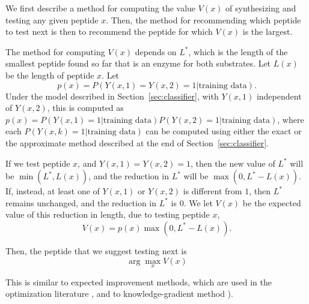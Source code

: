 \documentclass[12pt]{article}
\newcommand{\data}{\text{training data}}
\begin{document}
We first describe a method for computing the value $V(x)$ of synthesizing and testing any given peptide $x$.  Then, the method for recommending which peptide to test next is then to recommend the peptide for which $V(x)$ is the largest.

The method for computing $V(x)$ depends on $L^*$, which is the length of the smallest peptide found so far that is an enzyme for both substrates.  
Let $L(x)$ be the length of peptide $x$.
Let 
\begin{equation*}
  p(x) = P\left(Y(x,1)=Y(x,2)=1 | \data\right).
\end{equation*}
Under the model described in Section~\ref{sec:classifier}, with $Y(x,1)$ independent of $Y(x,2)$, this is computed as $p(x) = P\left(Y(x,1)=1 | \data\right) P\left(Y(x,2)=1 | \data\right)$, where each $P(Y(x,k)=1 | \data)$ can be computed using either the exact or the approximate method described at the end of Section~\ref{sec:classifier}.

If we test peptide $x$, and $Y(x,1)=Y(x,2)=1$, then the new value of $L^*$ will be $\min(L^*,L(x))$, and the reduction in $L^*$ will be $\max(0,L^*-L(x))$.
If, instead, at least one of $Y(x,1)$ or $Y(x,2)$ is different from $1$, then $L^*$ remains unchanged, and the reduction in $L^*$ is $0$.  
We let $V(x)$ be the expected value of this reduction in length, due to testing peptide $x$,
\begin{equation*}
  V(x) = p(x)\max(0,L^*-L(x)).
\end{equation*}

Then, the peptide that we suggest testing next is 
\begin{equation*}
  \arg\max_x V(x)
\end{equation*}

This is similar to expected improvement methods, which are used in the optimization literature \cite{JoScWe98},
and to knowledge-gradient method \cite{PoRy12,PoFr08}).  
\end{document}
